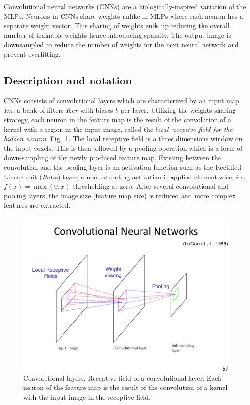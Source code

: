 \documentclass[final, paper=letter,5p,times,twocolumn]{elsarticle}
\begin{document}
Convolutional neural networks (CNNs) are a biologically-inspired variation of the MLPs. Neurons in CNNs share weights unlike in MLPs where each neuron has a separate weight vector. This sharing of weights ends up reducing the overall number of trainable weights hence introducing sparsity. The output image is downsampled to reduce the number of weights for the next neural network and prevent overfitting.

\subsection{Description and notation}

CNNs consists of convolutional layers which are characterized by an input map $Im$, a bank of filters $Ker$ with biases $b$ per layer. Utilizing the weights sharing strategy, each neuron in the feature map is the result of the convolution of a kernel with a region in the input image, called the {\it local receptive field for the hidden neuron}, Fig.~\ref{fig:Convolutional_layers}. The local receptive field is a three dimensions window on the input voxels. This is then followed by a pooling operation which is a form of down-sampling of the newly produced feature map. Existing between the convolution and the pooling layer is an activation function such as the Rectified Linear unit ({\it ReLu}) layer; a non-saturating activation is applied element-wise, {\it i.e.} $f(x) = \max(0,x)$ thresholding at zero. After several convolutional and pooling layers, the image size (feature map size) is reduced and more complex features are extracted. \\

\begin{figure}[htbp]
   \begin{center}
      \includegraphics[scale=0.3, angle=0]{images/Bishop_cnn_layer.jpg}
   \end{center}
   \caption{Convolutional layers. Receptive field of a convolutional layer. Each neuron of the feature map is the result of the convolution of a kernel with the input image in the receptive field.}
  \label{fig:Convolutional_layers} 
\end{figure}
\end{document}
